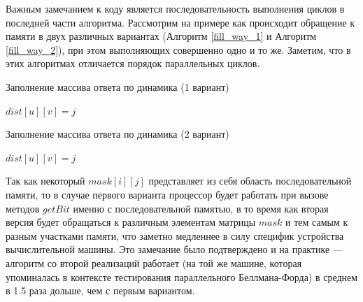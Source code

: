 Важным замечанием к коду является последовательность выполнения циклов в последней части алгоритма. Рассмотрим на примере как происходит обращение к памяти в двух различных вариантах (Алгоритм \ref{fill_way_1} и Алгоритм \ref{fill_way_2}), при этом выполняющих совершенно одно и то же. Заметим, что в этих алгоритмах отличается порядок параллельных циклов. 

\FloatBarrier
\begin{algorithm}
\caption{Заполнение массива ответа по динамика (1 вариант)}\label{fill_way_1}
\begin{algorithmic}[1]

\algrenewcommand{}
\algrenewcommand{}
		\algrenewcommand{}	
				\State $dist[u][v] = j$		
			\EndIf	
		\EndFor
		\algrenewcommand{}
	\EndFor
\EndFor 
\EndProcedure
\end{algorithmic}
\end{algorithm}

\FloatBarrier
\begin{algorithm}
\caption{Заполнение массива ответа по динамика (2 вариант)}\label{fill_way_2}
\begin{algorithmic}[1]

\algrenewcommand{}
\algrenewcommand{}
		\algrenewcommand{}	
				\State $dist[u][v] = j$		
			\EndIf	
		\EndFor
		\algrenewcommand{}
	\EndFor
\EndFor 
\EndProcedure
\end{algorithmic}
\end{algorithm}
\FloatBarrier

Так как некоторый $mask[i][j]$ представляет из себя область последовательной памяти, то в случае первого варианта процессор будет работать при вызове методов $getBit$ именно с последовательной памятью, в то время как вторая версия будет обращаться к различным элементам матрицы $mask$ и тем самым к разным участками памяти, что заметно медленнее в силу специфик устройства вычислительной машины. Это замечание было подтверждено и на практике --- алгоритм со второй реализаций работает (на той же машине, которая упоминалась в контексте тестирования параллельного Беллмана-Форда) в среднем в 1.5 раза дольше, чем с первым вариантом.

